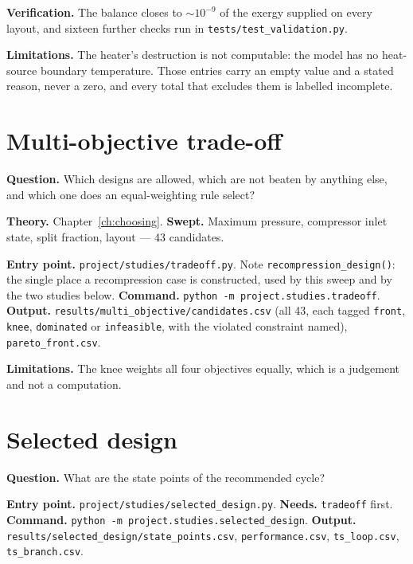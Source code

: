 \documentclass[11pt,a4paper]{report}
\newcommand{\code}[1]{\texttt{\small #1}}
\begin{document}
\textbf{Verification.} The balance closes to $\sim10^{-9}$ of the
exergy supplied on every layout, and sixteen further checks run in
\code{tests/test\_validation.py}.

\textbf{Limitations.} The heater's destruction is not computable: the
model has no heat-source boundary temperature. Those entries carry an
empty value and a stated reason, never a zero, and every total that
excludes them is labelled incomplete.

\section{Multi-objective trade-off}

\textbf{Question.} Which designs are allowed, which are not beaten by
anything else, and which one does an equal-weighting rule select?

\textbf{Theory.} Chapter~\ref{ch:choosing}.
\textbf{Swept.} Maximum pressure, compressor inlet state, split
fraction, layout --- 43 candidates.

\textbf{Entry point.} \code{project/studies/tradeoff.py}. Note
\code{recompression\_design()}: the single place a recompression case is
constructed, used by this sweep and by the two studies below.
\textbf{Command.} \code{python -m project.studies.tradeoff}.
\textbf{Output.} \code{results/multi\_objective/candidates.csv} (all 43,
each tagged \code{front}, \code{knee}, \code{dominated} or
\code{infeasible}, with the violated constraint named),
\code{pareto\_front.csv}.

\textbf{Limitations.} The knee weights all four objectives equally,
which is a judgement and not a computation.

\section{Selected design}

\textbf{Question.} What are the state points of the recommended cycle?

\textbf{Entry point.} \code{project/studies/selected\_design.py}.
\textbf{Needs.} \code{tradeoff} first.
\textbf{Command.} \code{python -m project.studies.selected\_design}.
\textbf{Output.} \code{results/selected\_design/state\_points.csv},
\code{performance.csv}, \code{ts\_loop.csv}, \code{ts\_branch.csv}.
\end{document}
